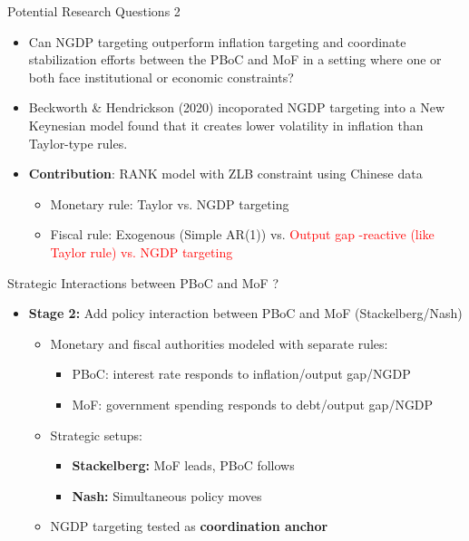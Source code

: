 \documentclass{beamer}
\begin{document}
\begin{frame}{Potential Research Questions 2}
  \begin{itemize}
    \item Can NGDP targeting outperform inflation targeting and coordinate stabilization efforts between the PBoC and MoF in a setting where one or both face institutional or economic constraints?
    \item Beckworth \& Hendrickson (2020) incoporated NGDP targeting into a New Keynesian model found that it creates lower volatility in inflation than Taylor-type rules.

    \item \textbf{Contribution}: RANK model with ZLB constraint using Chinese data
    \begin{itemize}
      \item Monetary rule: Taylor vs. NGDP targeting
      \item Fiscal rule: Exogenous (Simple AR(1)) vs. \textcolor{red}{Output gap -reactive (like Taylor rule) vs. NGDP targeting}
    \end{itemize}
  \end{itemize}
\end{frame}


\begin{frame}{Strategic Interactions between PBoC and MoF ?}
  \begin{itemize}
    \item \textbf{Stage 2:} Add policy interaction between PBoC and MoF (Stackelberg/Nash)
    \begin{itemize}
      \item Monetary and fiscal authorities modeled with separate rules:
      \begin{itemize}
        \item PBoC: interest rate responds to inflation/output gap/NGDP
        \item MoF: government spending responds to debt/output gap/NGDP
      \end{itemize}
      \item Strategic setups:
      \begin{itemize}
        \item \textbf{Stackelberg:} MoF leads, PBoC follows
        \item \textbf{Nash:} Simultaneous policy moves
      \end{itemize}
      \item NGDP targeting tested as \textbf{coordination anchor}
    \end{itemize}
  \end{itemize}
\end{frame}
\end{document}
